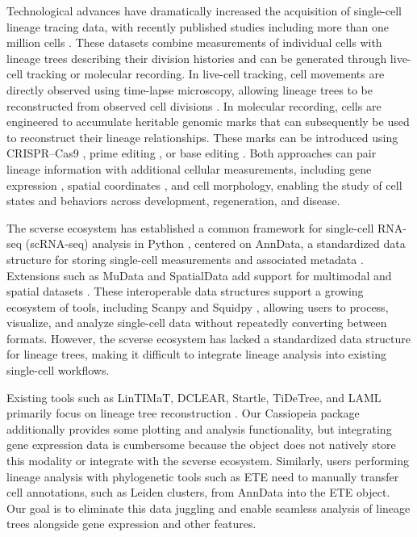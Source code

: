 Technological advances have dramatically increased the acquisition of single-cell lineage tracing data, with recently published studies including more than one million cells \citep{yu2026typewriter,colgan2026}. These datasets combine measurements of individual cells with lineage trees describing their division histories and can be generated through live-cell tracking or molecular recording. In live-cell tracking, cell movements are directly observed using time-lapse microscopy, allowing lineage trees to be reconstructed from observed cell divisions \citep{sulston1983lineage,keller2008zebrafish,mcdole2018intoto,ulman2017tracking,ershov2022trackmate}. In molecular recording, cells are engineered to accumulate heritable genomic marks that can subsequently be used to reconstruct their lineage relationships. These marks can be introduced using CRISPR--Cas9 \citep{mckenna2016gestalt,chan2019molecular,bowling2020carlin,frieda2017memoir,chow2021intmemoir}, prime editing \citep{choi2022typewriter,koblan2025}, or base editing \citep{hwang2019l1,winter2026baseline}. Both approaches can pair lineage information with additional cellular measurements, including gene expression \citep{raj2018scgestalt,spanjaard2018linnaeus,bowling2020carlin,colgan2026}, spatial coordinates \citep{koblan2025}, and cell morphology, enabling the study of cell states and behaviors across development, regeneration, and disease.

The scverse ecosystem has established a common framework for single-cell RNA-seq (scRNA-seq) analysis in Python \citep{virshup2023scverse}, centered on AnnData, a standardized data structure for storing single-cell measurements and associated metadata \citep{virshup2024anndata}. Extensions such as MuData and SpatialData add support for multimodal and spatial datasets \citep{bredikhin2022muon,marconato2024spatialdata}. These interoperable data structures support a growing ecosystem of tools, including Scanpy \citep{wolf2018scanpy} and Squidpy \citep{palla2022squidpy}, allowing users to process, visualize, and analyze single-cell data without repeatedly converting between formats. However, the scverse ecosystem has lacked a standardized data structure for lineage trees, making it difficult to integrate lineage analysis into existing single-cell workflows.

Existing tools such as LinTIMaT, DCLEAR, Startle, TiDeTree, and LAML primarily focus on lineage tree reconstruction \citep{zafar2020lintimat,gong2022dclear,sashittal2023startle,seidel2022tidetree,chu2025laml,chu2026lamlpro}. Our Cassiopeia package \citep{jones2020cassiopeia} additionally provides some plotting and analysis functionality, but integrating gene expression data is cumbersome because the  object does not natively store this modality or integrate with the scverse ecosystem. Similarly, users performing lineage analysis with phylogenetic tools such as ETE \citep{huertacepas2016ete} need to manually transfer cell annotations, such as Leiden clusters, from AnnData into the ETE  object. Our goal is to eliminate this data juggling and enable seamless analysis of lineage trees alongside gene expression and other features.

